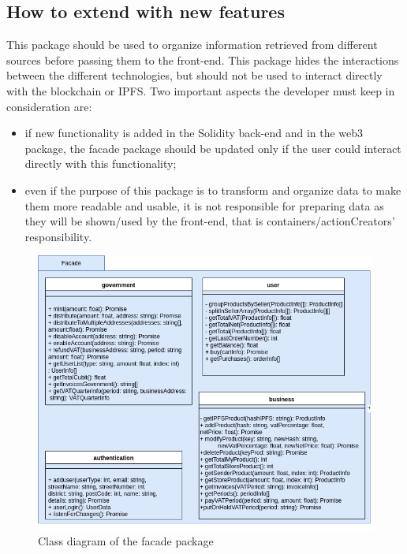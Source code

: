 \subsection{How to extend with new features}
This package should be used to organize information retrieved from different sources before passing them to the front-end. This package hides the interactions between the different technologies, but should not be used to interact directly with the blockchain or IPFS. Two important aspects the developer must keep in consideration are:
\begin{itemize}
	\item if new functionality is added in the Solidity back-end and in the web3 package, the facade package should be updated only if the user could interact directly with this functionality;
	\item even if the purpose of this package is to transform and organize data to make them more readable and usable, it is not responsible for preparing data as they will be shown/used by the front-end, that is containers/actionCreators' responsibility.
\end{itemize}
\begin{figure}[H]
	\centering
	\includegraphics[scale=0.55]{res/images/facade-package.png}
	\caption{Class diagram of the facade package}
\end{figure}


